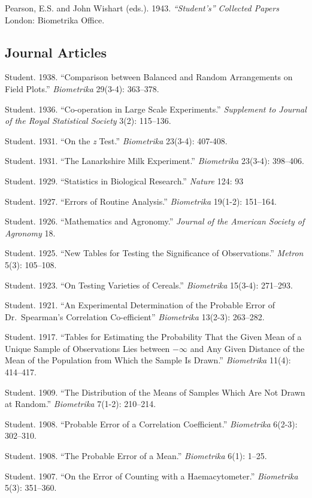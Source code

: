 \documentclass[11pt,]{article}
\begin{document}
Pearson, E.S. and John Wishart (eds.). 1943. \emph{``Student's''
Collected Papers} London: Biometrika Office.

\subsection{Journal Articles}\label{journal-articles}

Student. 1938. ``Comparison between Balanced and Random Arrangements on
Field Plots.'' \emph{Biometrika} 29(3-4): 363--378.

Student. 1936. ``Co-operation in Large Scale Experiments.''
\emph{Supplement to Journal of the Royal Statistical Society} 3(2):
115--136.

Student. 1931. ``On the \emph{z} Test.'' \emph{Biometrika} 23(3-4):
407-408.

Student. 1931. ``The Lanarkshire Milk Experiment.'' \emph{Biometrika}
23(3-4): 398--406.

Student. 1929. ``Statistics in Biological Research.'' \emph{Nature} 124:
93

Student. 1927. ``Errors of Routine Analysis.'' \emph{Biometrika}
19(1-2): 151--164.

Student. 1926. ``Mathematics and Agronomy.'' \emph{Journal of the
American Society of Agronomy} 18.

Student. 1925. ``New Tables for Testing the Significance of
Observations.'' \emph{Metron} 5(3): 105--108.

Student. 1923. ``On Testing Varieties of Cereals.'' \emph{Biometrika}
15(3-4): 271--293.

Student. 1921. ``An Experimental Determination of the Probable Error of
Dr.~Spearman's Correlation Co-efficient'' \emph{Biometrika} 13(2-3):
263--282.

Student. 1917. ``Tables for Estimating the Probability That the Given
Mean of a Unique Sample of Observations Lies between \(-\infty\) and Any
Given Distance of the Mean of the Population from Which the Sample Is
Drawn.'' \emph{Biometrika} 11(4): 414--417.

Student. 1909. ``The Distribution of the Means of Samples Which Are Not
Drawn at Random.'' \emph{Biometrika} 7(1-2): 210--214.

Student. 1908. ``Probable Error of a Correlation Coefficient.''
\emph{Biometrika} 6(2-3): 302--310.

Student. 1908. ``The Probable Error of a Mean.'' \emph{Biometrika} 6(1):
1--25.

Student. 1907. ``On the Error of Counting with a Haemacytometer.''
\emph{Biometrika} 5(3): 351--360.
\end{document}
